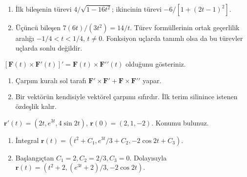 \begin{tcolorbox}[title={Adım adım çözüm},colback=green!3!white,colframe=green]\begin{enumerate}
\item İlk bileşenin türevi \(4/\sqrt{1-16t^2}\); ikincinin türevi \(-6/[1+(2t-1)^2]\).
\item Üçüncü bileşen \(7(6t)/(3t^2)=14/t\). Türev formüllerinin ortak geçerlilik aralığı \(-1/4<t<1/4\), \(t\ne0\). Fonksiyon uçlarda tanımlı olsa da bu türevler uçlarda sonlu değildir.
\end{enumerate}\end{tcolorbox}
\begin{tcolorbox}[title={Örnek 3.9 | Tahtadaki özdeşliğin kanıtı},colframe=accent]\([\mathbf F(t)\times\mathbf F\prime(t)]\prime=\mathbf F(t)\times\mathbf F\prime\prime(t)\) olduğunu gösteriniz.
\par{}\end{tcolorbox}
\begin{tcolorbox}[title={Adım adım çözüm},colback=green!3!white,colframe=green]\begin{enumerate}
\item Çarpım kuralı sol tarafı \(\mathbf F\prime\times\mathbf F\prime+\mathbf F\times\mathbf F\prime\prime\) yapar.
\item Bir vektörün kendisiyle vektörel çarpımı sıfırdır. İlk terim silinince istenen özdeşlik kalır.
\end{enumerate}\end{tcolorbox}
\begin{tcolorbox}[title={Örnek 3.10 | Başlangıç koşullu integral},colframe=accent]\(\mathbf r\prime(t)=(2t,e^{3t},4\sin2t)\), \(\mathbf r(0)=(2,1,-2)\). Konumu bulunuz.
\par{}\end{tcolorbox}
\begin{tcolorbox}[title={Adım adım çözüm},colback=green!3!white,colframe=green]\begin{enumerate}
\item İntegral \(\mathbf r(t)=(t^2+C_1,e^{3t}/3+C_2,-2\cos2t+C_3)\).
\item Başlangıçtan \(C_1=2,C_2=2/3,C_3=0\). Dolayısıyla \(\mathbf r(t)=(t^2+2,(e^{3t}+2)/3,-2\cos2t)\).
\end{enumerate}\end{tcolorbox}
